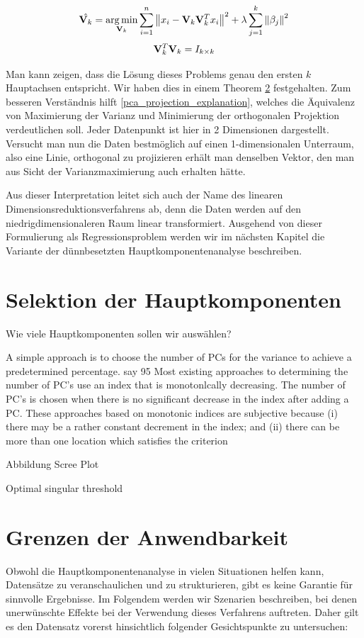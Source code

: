 $$\hat{\mathbf{V}_k} = \operatorname*{arg\,min}_{\mathbf{V}_k} \sum_{i=1}^{n} \left\lVert x_i - \mathbf{V}_k \mathbf{V}_k^Tx_i \right\rVert^2 + \lambda \sum_{j=1}^{k}\left\lVert \beta_j \right\rVert^2$$
$$\mathbf{V}_k^T\mathbf{V}_k = I_{k \times k}$$

Man kann zeigen, dass die Lösung dieses Problems genau den ersten $k$ Hauptachsen entspricht. Wir haben dies in einem Theorem \ref{theo_results} festgehalten.  \cite{vidal} Zum besseren Verständnis hilft \ref{pca_projection_explanation}, welches die Äquivalenz von Maximierung der Varianz und Minimierung der orthogonalen Projektion verdeutlichen soll. Jeder Datenpunkt ist hier in 2 Dimensionen dargestellt. Versucht man nun die Daten bestmöglich auf einen 1-dimensionalen Unterraum, also eine Linie, orthogonal zu projizieren erhält man denselben Vektor, den man aus Sicht der Varianzmaximierung auch erhalten hätte. 

Aus dieser Interpretation leitet sich auch der Name des linearen Dimensionsreduktionsverfahrens ab, denn die Daten werden auf den niedrigdimensionaleren Raum linear transformiert. Ausgehend von dieser Formulierung als Regressionsproblem werden wir im nächsten Kapitel die Variante der dünnbesetzten Hauptkomponentenanalyse beschreiben.


\section{Selektion der Hauptkomponenten}
\label{selection_principal_components}
Wie viele Hauptkomponenten sollen wir auswählen?

A simple approach is to choose the number of
PCs for the variance to achieve a predetermined
percentage. say 95%
Most existing approaches to determining the number of PC's use an index that is monotonlcally
decreasing. The number of PC's is chosen when
there is no significant decrease in the index after
adding a PC. These approaches based on monotonic indices are subjective because (i) there may
be a rather constant decrement in the index; and
(ii) there can be more than one location which
satisfies the criterion

Abbildung Scree Plot

Optimal singular threshold \cite{gavish}

\section{Grenzen der Anwendbarkeit} \label{theo_results}

Obwohl die Hauptkomponentenanalyse in vielen Situationen helfen kann, Datensätze zu veranschaulichen und zu strukturieren, gibt es keine Garantie für sinnvolle Ergebnisse. Im Folgendem werden wir Szenarien beschreiben, bei denen unerwünschte Effekte bei der Verwendung dieses Verfahrens auftreten. Daher gilt es den Datensatz vorerst hinsichtlich folgender Gesichtspunkte zu untersuchen: 

